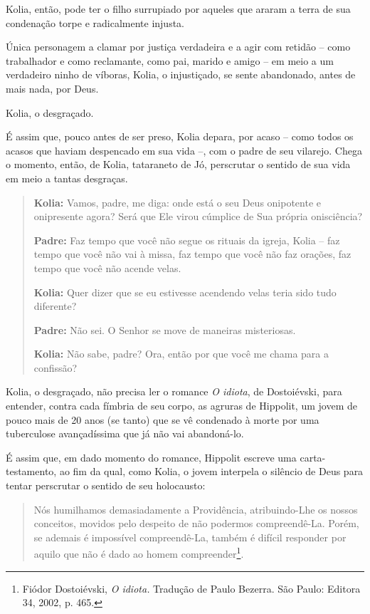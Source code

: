Kolia, então, pode ter o filho surrupiado por aqueles que araram a terra
de sua condenação torpe e radicalmente injusta.

Única personagem a clamar por justiça verdadeira e a agir com retidão --
como trabalhador e como reclamante, como pai, marido e amigo -- em meio
a um verdadeiro ninho de víboras, Kolia, o injustiçado, se sente
abandonado, antes de mais nada, por Deus.

Kolia, o desgraçado.

É assim que, pouco antes de ser preso, Kolia depara, por acaso -- como
todos os acasos que haviam despencado em sua vida --, com o padre de seu
vilarejo. Chega o momento, então, de Kolia, tataraneto de Jó, perscrutar
o sentido de sua vida em meio a tantas desgraças.

\begin{quote}
\textbf{Kolia:} Vamos, padre, me diga: onde está o seu Deus onipotente e
onipresente agora? Será que Ele virou cúmplice de Sua própria
onisciência?

\textbf{Padre:} Faz tempo que você não segue os rituais da igreja, Kolia
-- faz tempo que você não vai à missa, faz tempo que você não faz
orações, faz tempo que você não acende velas.

\textbf{Kolia:} Quer dizer que se eu estivesse acendendo velas teria
sido tudo diferente?

\textbf{Padre:} Não sei. O Senhor se move de maneiras misteriosas.

\textbf{Kolia:} Não sabe, padre? Ora, então por que você me chama para a
confissão?
\end{quote}

Kolia, o desgraçado, não precisa ler o romance \emph{O idiota}, de
Dostoiévski, para entender, contra cada fímbria de seu corpo, as agruras
de Hippolit, um jovem de pouco mais de 20 anos (se tanto) que se vê
condenado à morte por uma tuberculose avançadíssima que já não vai
abandoná-lo.

É assim que, em dado momento do romance, Hippolit escreve uma
carta-testamento, ao fim da qual, como Kolia, o jovem interpela o
silêncio de Deus para tentar perscrutar o sentido de seu holocausto:

\begin{quote}
Nós humilhamos demasiadamente a Providência, atribuindo-Lhe os nossos
conceitos, movidos pelo despeito de não podermos compreendê-La. Porém,
se ademais é impossível compreendê-La, também é difícil responder por
aquilo que não é dado ao homem compreender\footnote{Fiódor Dostoiévski,
  \emph{O idiota.} Tradução de Paulo Bezerra. São Paulo: Editora 34,
  2002, p. 465.}.
\end{quote}

